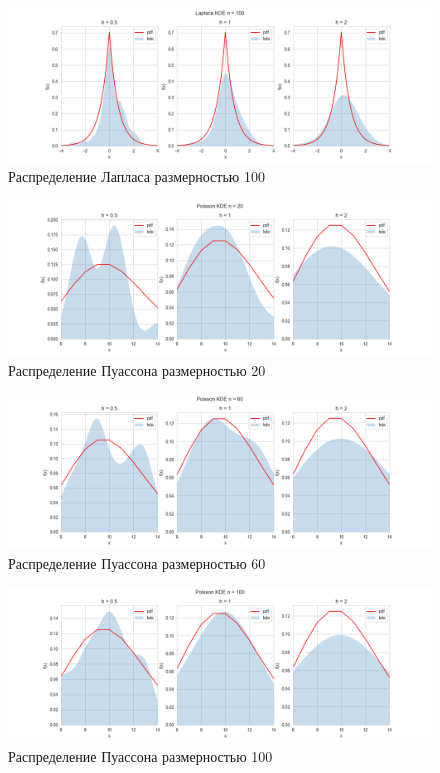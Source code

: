 \documentclass[12pt,a4paper]{article}
\begin{document}
\begin{figure}[H]
    \centering
    \includegraphics[scale=0.5]{images/Laplace100.png}
    \caption{Распределение Лапласа размерностью 100}
\end{figure}

\begin{figure}[H]
    \centering
    \includegraphics[scale=0.5]{images/Poisson20.png}
    \caption{Распределение Пуассона размерностью 20}
\end{figure}

\begin{figure}[H]
    \centering
    \includegraphics[scale=0.5]{images/Poisson60.png}
    \caption{Распределение Пуассона размерностью 60}
\end{figure}

\begin{figure}[H]
    \centering
    \includegraphics[scale=0.5]{images/Poisson100.png}
    \caption{Распределение Пуассона размерностью 100}
\end{figure}
\end{document}
